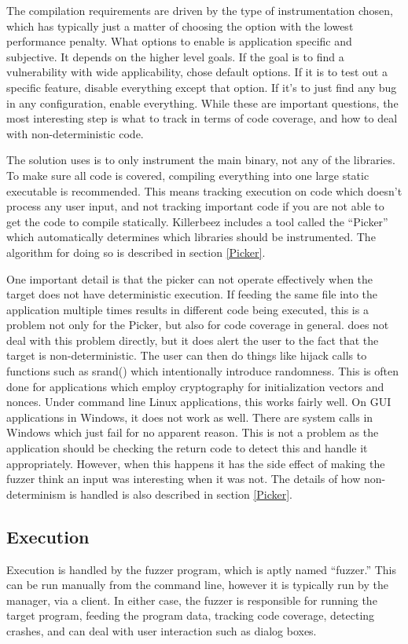 The compilation requirements are driven by the type of instrumentation chosen,
which has typically just a matter of choosing the option with the lowest
performance penalty. What options to enable is application specific and
subjective.  It depends on the higher level goals.  If the goal is to find a
vulnerability with wide applicability, chose default options. If it is to test
out a specific feature, disable everything except that option. If it's to just
find any bug in any configuration, enable everything.  While these are
important questions, the most interesting step is what to track in terms of
code coverage, and how to deal with non-deterministic code.

The solution \AFL{} uses is to only instrument the main binary, not any of the
libraries. To make sure all code is covered, compiling everything into one
large static executable is recommended. This means tracking execution on code
which doesn't process any user input, and not tracking important code if you
are not able to get the code to compile statically. Killerbeez includes a tool
called the ``Picker'' which automatically determines which libraries should be
instrumented.  The algorithm for doing so is described in section \ref{Picker}.

One important detail is that the picker can not operate effectively when the
target does not have deterministic execution.  If feeding the same file into
the application multiple times results in different code being executed, this
is a problem not only for the Picker, but also for code coverage in general.
\AFL{} does not deal with this problem directly, but it does alert the user to
the fact that the target is non-deterministic. The user can then do things like
hijack calls to functions such as srand() which intentionally introduce
randomness. This is often done for applications which employ cryptography for
initialization vectors and nonces. Under command line Linux applications, this
works fairly well.  On GUI applications in Windows, it does not work as well.
There are system calls in Windows which just fail for no apparent reason. This
is not a problem as the application should be checking the return code to
detect this and handle it appropriately.  However, when this happens it has the
side effect of making the fuzzer think an input was interesting when it was
not.  The details of how non-determinism is handled is also described in
section \ref{Picker}.

\subsection{Execution}
Execution is handled by the fuzzer program, which is aptly named ``fuzzer.''
This can be run manually from the command line, however it is typically run by
the manager, via a \BOINC{} client.  In either case, the fuzzer is responsible
for running the target program, feeding the program data, tracking code
coverage, detecting crashes, and can deal with user interaction such as dialog
boxes.

